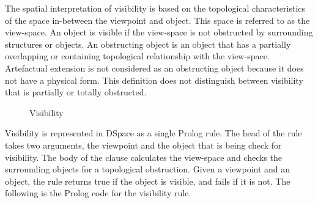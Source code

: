 \documentclass[12pt]{ucthesis}
\begin{document}
The spatial interpretation of visibility is based on the topological characteristics of the space in-between the viewpoint and object. This space is referred to as the view-space. An object is visible if the view-space is not obstructed by surrounding structures or objects. An obstructing object is an object that has a partially overlapping or containing topological relationship with the view-space. Artefactual extension is not considered as an obstructing object because it does not have a physical form. This definition does not distinguish between visibility that is partially or totally obstructed.

\begin{figure}[H]
 \centering
  \hspace{10 mm}
 \caption{Visibility}
\label{Visibility}
\end{figure}



Visibility is represented in DSpace as a single Prolog rule. The head of the rule takes two arguments, the viewpoint and the object that is being check for visibility. The body of the clause calculates the view-space and checks the surrounding objects for a topological obstruction. Given a viewpoint and an object, the rule returns true if the object is visible, and fails if it is not. The following is the Prolog code for the visibility rule.
\end{document}

